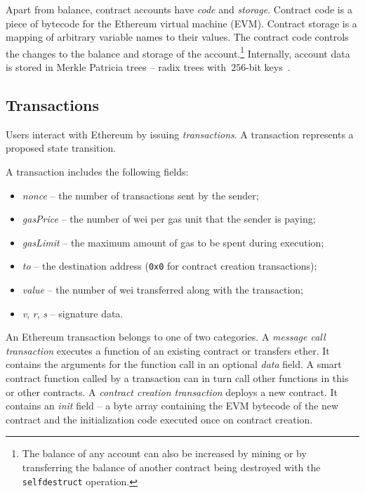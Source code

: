 Apart from balance, contract accounts have \textit{code} and \textit{storage}.
Contract code is a piece of bytecode for the Ethereum virtual machine (EVM).
Contract storage is a mapping of arbitrary variable names to their values.
The contract code controls the changes to the balance and storage of the account.\footnote{The balance of any account can also be increased by mining or by transferring the balance of another contract being destroyed with the \texttt{selfdestruct} operation.}
Internally, account data is stored in Merkle Patricia trees -- radix trees with~$256$-bit keys~\cite{MPTSpec, Buchman14}.


\subsection{Transactions}

Users interact with Ethereum by issuing \textit{transactions}.
A transaction represents a proposed state transition.

A transaction includes the following fields:
\begin{itemize}
	\item \emph{nonce} -- the number of transactions sent by the sender;
	\item \emph{gasPrice} -- the number of wei per gas unit that the sender is paying;
	\item \emph{gasLimit} -- the maximum amount of gas to be spent during execution;
	\item \emph{to} -- the destination address (\texttt{0x0} for contract creation transactions);
	\item \emph{value} -- the number of wei transferred along with the transaction;
	\item \emph{v}, \emph{r}, \emph{s} -- signature data.
\end{itemize}

An Ethereum transaction belongs to one of two categories.
A \textit{message call transaction} executes a function of an existing contract or transfers ether.
It contains the arguments for the function call in an optional \textit{data} field.
A smart contract function called by a transaction can in turn call other functions in this or other contracts.
A \textit{contract creation transaction} deploys a new contract.
It contains an \emph{init} field -- a byte array containing the EVM bytecode of the new contract and the initialization code executed once on contract creation.

